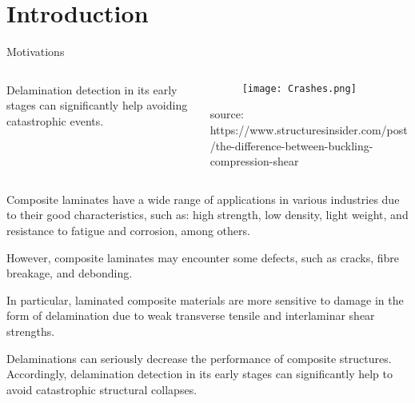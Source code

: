 \documentclass[10pt,aspectratio=169,dvipsnames]{beamer} %
\begin{document}
	\section{Introduction}
	\begin{frame}{Motivations}
		\begin{columns}[T]
			\begin{column}[t]{.55\textwidth}
				\begin{figure}[t]
				\end{figure}
				\begin{tcolorbox}
					\justifying\noindent\alert{Delamination detection} in its early stages can significantly help avoiding catastrophic events.
				\end{tcolorbox}				
			\end{column}
			\begin{column}[t]{0.45\textwidth}
				\begin{figure}[t]
					\texttt{[image: Crashes.png]}
				\end{figure}
			\tiny {source: https://www.structuresinsider.com/post/the-difference-between-buckling-compression-shear}
			\end{column}
		\end{columns}
	\end{frame}
	\note
	{
		Composite laminates have a wide range of applications in various industries due to their good characteristics, such as:
		high strength, low density, light weight, and resistance to fatigue and corrosion, among others.
		
		However, composite laminates may encounter some defects, such as cracks, fibre breakage, and debonding.
		
		In particular, laminated composite materials are more sensitive to damage in the form of delamination due to weak transverse tensile and interlaminar shear strengths.
			
		Delaminations can seriously decrease the performance of composite structures.
		Accordingly, delamination detection in its early stages can significantly help to avoid catastrophic structural collapses.
	}
\end{document}
